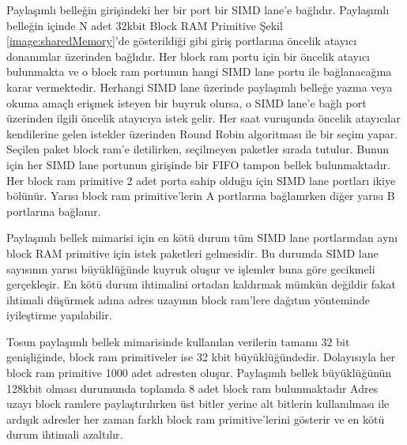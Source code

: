Paylaşımlı belleğin girişindeki her bir port bir SIMD lane'e bağlıdır. Paylaşımlı belleğin içinde N adet 32kbit Block RAM Primitive Şekil \ref{image:sharedMemory}'de gösterildiği gibi giriş portlarına öncelik atayıcı donanımlar üzerinden bağlıdır. Her block ram portu için bir öncelik atayıcı bulunmakta ve o block ram portunun hangi SIMD lane portu ile bağlanacağına karar vermektedir. Herhangi SIMD lane üzerinde paylaşımlı belleğe yazma veya okuma amaçlı erişmek isteyen bir buyruk olursa, o SIMD lane'e bağlı port üzerinden ilgili öncelik atayıcıya istek gelir. Her saat vuruşunda öncelik atayıcılar kendilerine gelen istekler üzerinden Round Robin algoritması ile bir seçim yapar. Seçilen paket block ram'e iletilirken, seçilmeyen paketler sırada tutulur. Bunun için her SIMD lane portunun girişinde bir FIFO tampon bellek bulunmaktadır. Her block ram primitive 2 adet porta sahip olduğu için SIMD lane portları ikiye bölünür. Yarısı block ram primitive'lerin A portlarına bağlanırken diğer yarısı B portlarına bağlanır.\par

Paylaşımlı bellek mimarisi için en kötü durum tüm SIMD lane portlarından aynı block RAM primitive için istek paketleri gelmesidir. Bu durumda SIMD lane sayısının yarısı büyüklüğünde kuyruk oluşur ve işlemler buna göre gecikmeli gerçekleşir. En kötü durum ihtimalini ortadan kaldırmak mümkün değildir fakat ihtimali düşürmek adına adres uzayının block ram'lere dağıtım yönteminde iyileştirme yapılabilir. \par

Tosun paylaşımlı bellek mimarisinde kullanılan verilerin tamamı 32 bit genişliğinde, block ram primitiveler ise 32 kbit büyüklüğündedir. Dolayısıyla her block ram primitive 1000 adet adresten oluşur. Paylaşımlı bellek büyüklüğünün 128kbit olması durumunda toplamda 8 adet block ram bulunmaktadır Adres uzayı block ramlere paylaştırılırken üst bitler yerine alt bitlerin kullanılması ile ardışık adresler her zaman farklı block ram primitive'lerini gösterir ve en kötü durum ihtimali azaltılır. 
